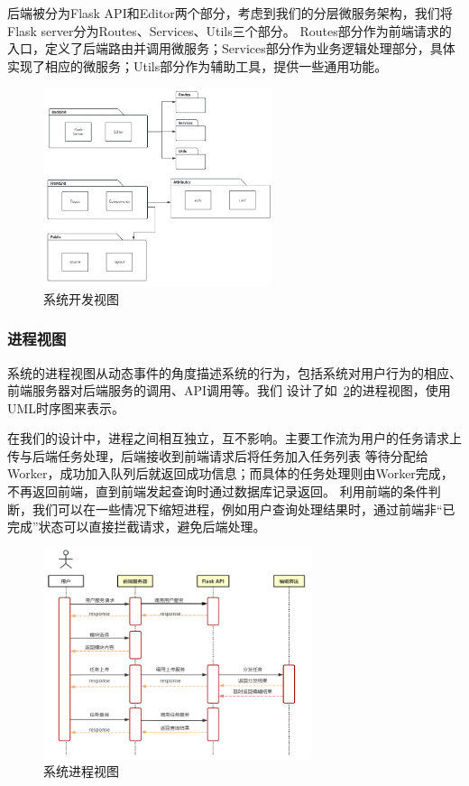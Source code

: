 后端被分为Flask API和Editor两个部分，考虑到我们的分层微服务架构，我们将Flask server分为Routes、Services、Utils三个部分。
Routes部分作为前端请求的入口，定义了后端路由并调用微服务；Services部分作为业务逻辑处理部分，具体实现了相应的微服务；Utils部分作为辅助工具，提供一些通用功能。

\begin{figure}[ht]
    \centering
    \includegraphics[width=0.6\textwidth]{source/img/system_develop.png}
    \caption{系统开发视图}
    \label{fig:system-develop}
\end{figure}

\subsubsection{进程视图}

系统的进程视图从动态事件的角度描述系统的行为，包括系统对用户行为的相应、前端服务器对后端服务的调用、API调用等。我们
设计了如~\ref{fig:system-process}的进程视图，使用UML时序图来表示。

在我们的设计中，进程之间相互独立，互不影响。主要工作流为用户的任务请求上传与后端任务处理，后端接收到前端请求后将任务加入任务列表
等待分配给Worker，成功加入队列后就返回成功信息；而具体的任务处理则由Worker完成，不再返回前端，直到前端发起查询时通过数据库记录返回。
利用前端的条件判断，我们可以在一些情况下缩短进程，例如用户查询处理结果时，通过前端非“已完成”状态可以直接拦截请求，避免后端处理。

\begin{figure}[ht]
    \centering
    \includegraphics[width=0.7\textwidth]{source/img/system_process.png}
    \caption{系统进程视图}
    \label{fig:system-process}
\end{figure}

